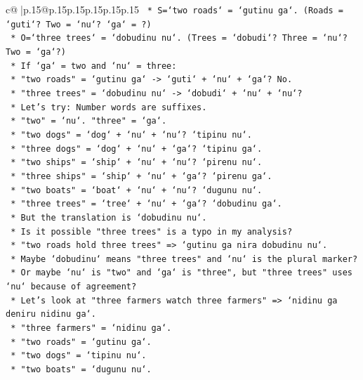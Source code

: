 \documentclass{article}
\begin{document}
{\begin{supertabular}{c@{$\;$}|p{.15\linewidth}@{}p{.15\linewidth}p{.15\linewidth}p{.15\linewidth}p{.15\linewidth}p{.15\linewidth}}
{{{\texttt{        *   S=`two roads` = `gutinu ga`. (Roads = `guti`? Two = `nu`? `ga` = ?)} \\
\texttt{        *   O=`three trees` = `dobudinu nu`. (Trees = `dobudi`? Three = `nu`? Two = `ga`?)} \\
\texttt{        *   If `ga` = two and `nu` = three:} \\
\texttt{            *   "two roads" = `gutinu ga` {-}> `guti` + `nu` + `ga`? No.} \\
\texttt{            *   "three trees" = `dobudinu nu` {-}> `dobudi` + `nu` + `nu`?} \\
\texttt{        *   Let's try: Number words are suffixes.} \\
\texttt{        *   "two" = `nu`. "three" = `ga`.} \\
\texttt{        *   "two dogs" = `dog` + `nu` + `nu`? `tipinu nu`.} \\
\texttt{        *   "three dogs" = `dog` + `nu` + `ga`? `tipinu ga`.} \\
\texttt{        *   "two ships" = `ship` + `nu` + `nu`? `pirenu nu`.} \\
\texttt{        *   "three ships" = `ship` + `nu` + `ga`? `pirenu ga`.} \\
\texttt{        *   "two boats" = `boat` + `nu` + `nu`? `dugunu nu`.} \\
\texttt{        *   "three trees" = `tree` + `nu` + `ga`? `dobudinu ga`.} \\
\texttt{        *   But the translation is `dobudinu nu`.} \\
\texttt{        *   Is it possible "three trees" is a typo in my analysis?} \\
\texttt{        *   "two roads hold three trees" => `gutinu ga nira dobudinu nu`.} \\
\texttt{        *   Maybe `dobudinu` means "three trees" and `nu` is the plural marker?} \\
\texttt{        *   Or maybe `nu` is "two" and `ga` is "three", but "three trees" uses `nu` because of agreement?} \\
\texttt{        *   Let's look at "three farmers watch three farmers" => `nidinu ga deniru nidinu ga`.} \\
\texttt{        *   "three farmers" = `nidinu ga`.} \\
\texttt{        *   "two roads" = `gutinu ga`.} \\
\texttt{        *   "two dogs" = `tipinu nu`.} \\
\texttt{        *   "two boats" = `dugunu nu`.} \\
}}}
\end{supertabular}}
\end{document}

